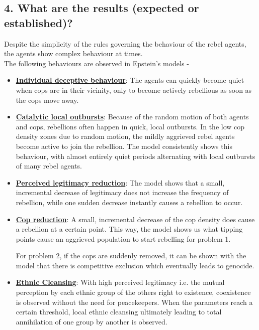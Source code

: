 \documentclass[a4paper,11pt]{article}
\begin{document}
\subsection*{4. What are the results (expected or established)?}
    Despite the simplicity of the rules governing the behaviour of the rebel agents, the agents show complex behaviour at times. 
    \\
    The following behaviours are observed in Epstein's models -
    \begin{itemize}
        \item\underline{\textbf{Individual deceptive behaviour}}: The agents can quickly become quiet when cops are in their vicinity, only to become actively rebellious as soon as the cops move away.
        \item\underline{\textbf{Catalytic local outbursts}}: Because of the random motion of both agents and cops, rebellions often happen in quick, local outbursts. In the low cop density zones due to random motion, the mildly aggrieved rebel agents become active to join the rebellion. The model consistently shows this behaviour, with almost entirely quiet periods alternating with local outbursts of many rebel agents.
        \item\underline{\textbf{Perceived legitimacy reduction}}: The model shows that a small, incremental decrease of legitimacy does not increase the frequency of rebellion, while one sudden decrease instantly causes a rebellion to occur.
        \item\underline{\textbf{Cop reduction}}: A small, incremental decrease of the cop density does cause a rebellion at a certain point. This way, the model shows us what tipping points cause an aggrieved population to start rebelling for problem 1.
        
        For problem 2, if the cops are suddenly removed, it can be shown with the model that there is competitive exclusion which eventually leads to genocide.
        \item\underline{\textbf{Ethnic Cleansing}}: With high perceived legitimacy i.e. the mutual perception by each ethnic group of the others right to existence, coexistence is observed without the need for peacekeepers. When the parameters reach a certain threshold, local ethnic cleansing ultimately leading to total annihilation of one group by another is observed.
    \end{itemize}
\end{document}
